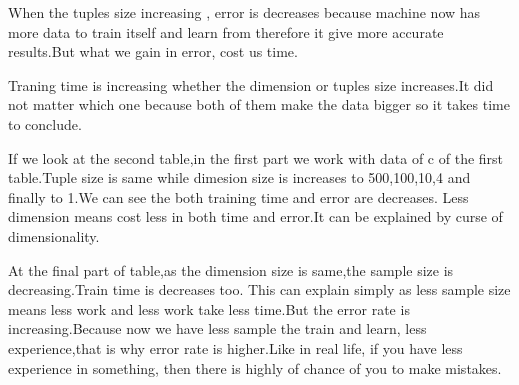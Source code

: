 \documentclass[onecolumn]{article}
\begin{document}
When the tuples size increasing , error is decreases because machine now
has more data to train itself and learn from therefore it give more accurate results.But what we gain in error, cost us time.

Traning time is increasing whether the dimension or tuples size increases.It did not matter which one because both of them make the data bigger so it takes time to conclude.

If we look at the second table,in the first part we work with data of c of the first table.Tuple size is same while dimesion size is increases to 500,100,10,4 and finally to 1.We can see the both training time and error are
decreases. Less dimension means cost less in both time and error.It can be explained by curse of dimensionality.

At the final part of table,as  the dimension size is same,the sample size is decreasing.Train time is decreases too. This can explain simply as less sample size means less work and less work take less time.But the error rate is increasing.Because now we have less sample the train and learn, less experience,that is why error rate is higher.Like in real life, if you have less experience in something, then there is highly of chance of you to make mistakes.



\nocite{*}

\end{document}
